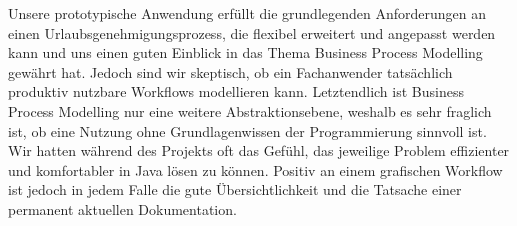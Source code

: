 Unsere prototypische Anwendung erfüllt die grundlegenden Anforderungen an einen Urlaubsgenehmigungsprozess, die flexibel erweitert und angepasst werden kann und uns einen guten Einblick in das Thema Business Process Modelling gewährt hat. Jedoch sind wir skeptisch, ob ein Fachanwender tatsächlich produktiv nutzbare Workflows modellieren kann. Letztendlich ist Business Process Modelling nur eine weitere Abstraktionsebene, weshalb es sehr fraglich ist, ob eine Nutzung ohne Grundlagenwissen der Programmierung sinnvoll ist. Wir hatten während des Projekts oft das Gefühl, das jeweilige Problem effizienter und komfortabler in Java lösen zu können. Positiv an einem grafischen Workflow ist jedoch in jedem Falle die gute Übersichtlichkeit und die Tatsache einer permanent aktuellen Dokumentation.